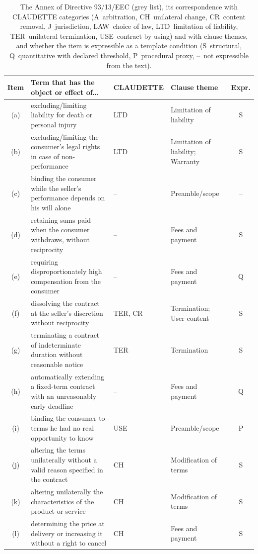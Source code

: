 \documentclass{IOS-Book-Article}
\newcommand{\corpus}{CLAUDETTE}
\begin{document}
\begin{table}[t]
\caption{The Annex of Directive 93/13/EEC (grey list), its correspondence with \corpus{} categories (A~arbitration, CH~unilateral change, CR~content removal, J~jurisdiction, LAW~choice of law, LTD~limitation of liability, TER~unilateral termination, USE~contract by using) and with clause themes, and whether the item is expressible as a template condition (S~structural, Q~quantitative with declared threshold, P~procedural proxy, --~not expressible from the text).}
\label{tab:greylist}
\centering
\footnotesize\setlength{\tabcolsep}{3pt}%
\begin{tabular}{@{}c p{5.3cm} p{1.75cm} p{2.7cm} c@{}}
\toprule
Item & Term that has the object or effect of\ldots & \corpus{} & Clause theme & Expr. \\
\midrule
(a) & excluding/limiting liability for death or personal injury & LTD & Limitation of liability & S \\
(b) & excluding/limiting the consumer's legal rights in case of non-performance & LTD & Limitation of liability; Warranty & S \\
(c) & binding the consumer while the seller's performance depends on his will alone & -- & Preamble/scope & -- \\
(d) & retaining sums paid when the consumer withdraws, without reciprocity & -- & Fees and payment & S \\
(e) & requiring disproportionately high compensation from the consumer & -- & Fees and payment & Q \\
(f) & dissolving the contract at the seller's discretion without reciprocity & TER, CR & Termination; User content & S \\
(g) & terminating a contract of indeterminate duration without reasonable notice & TER & Termination & S \\
(h) & automatically extending a fixed-term contract with an unreasonably early deadline & -- & Fees and payment & Q \\
(i) & binding the consumer to terms he had no real opportunity to know & USE & Preamble/scope & P \\
(j) & altering the terms unilaterally without a valid reason specified in the contract & CH & Modification of terms & S \\
(k) & altering unilaterally the characteristics of the product or service & CH & Modification of terms & S \\
(l) & determining the price at delivery or increasing it without a right to cancel & CH & Fees and payment & S \\

\end{tabular}
\end{table}
\end{document}
